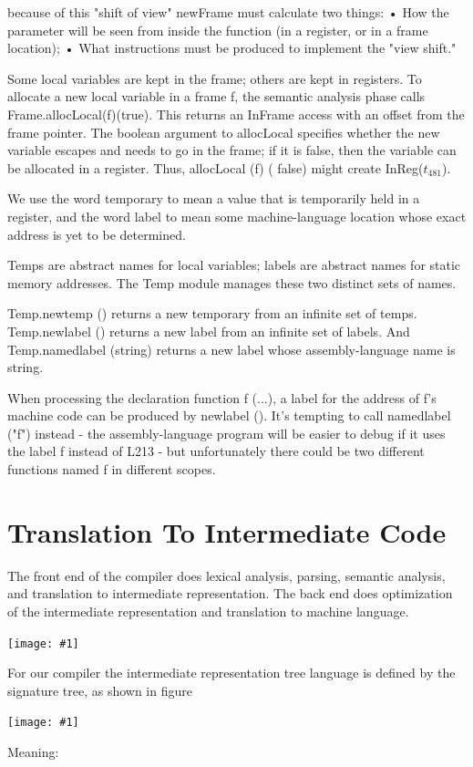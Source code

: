 \documentclass[8pt, a4paper, oneside, twocolumn]{extarticle}
\newcommand{\ph}[1]{
    \texttt{[image: \#1]}
}
\begin{document}
because of this "shift of view" newFrame must calculate two things:
• How the parameter will be seen from inside the function (in a register, or in a
frame location);
• What instructions must be produced to implement the "view shift."

Some local variables are kept in the frame; others are kept in registers. To
allocate a new local variable in a frame f, the semantic analysis phase calls
Frame.allocLocal(f)(true). This returns an InFrame access with an offset from the frame pointer.
The boolean argument to allocLocal specifies whether the new 
variable escapes and needs to go in the frame; if it is false, then the variable
can be allocated in a register. Thus, allocLocal (f) ( false) might create
InReg($t_{481}$).

We use the word
temporary to mean a value that is temporarily held in a register, and the word
label to mean some machine-language location whose exact address is yet to be determined.


Temps are abstract names for local variables; labels are abstract names
for static memory addresses. The Temp module manages these two distinct
sets of names.

Temp.newtemp () returns a new temporary from an infinite set of temps.
Temp.newlabel () returns a new label from an infinite set of labels. And
Temp.namedlabel (string) returns a new label whose assembly-language
name is string.

When processing the declaration function f (...), a label for the 
address of f's machine code can be produced by newlabel (). It's tempting to
call namedlabel ("f") instead - the assembly-language program will be
easier to debug if it uses the label f instead of L213 - but unfortunately there
could be two different functions named f in different scopes.
\section{Translation To Intermediate Code}
The front end of the compiler does lexical analysis, parsing,
semantic analysis, and translation to intermediate representation. The back
end does optimization of the intermediate representation and translation to
machine language.

\ph{ir1}

For our compiler the intermediate representation tree language is defined by the signature tree, as shown in figure

\ph{ir2}

Meaning:
\end{document}
